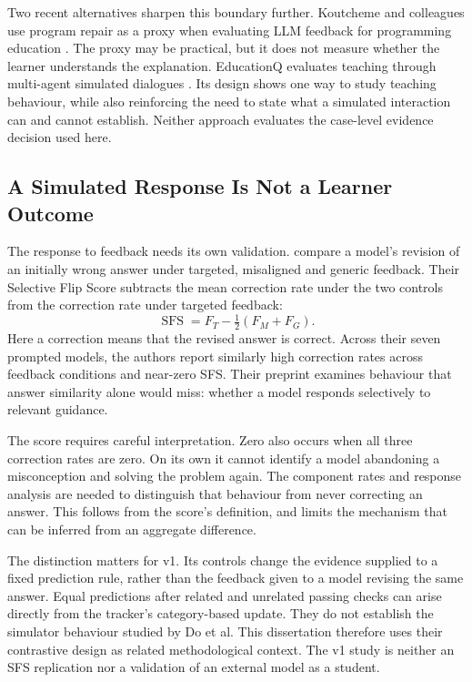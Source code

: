 Two recent alternatives sharpen this boundary further. Koutcheme and colleagues use program repair as a proxy when evaluating
LLM feedback for programming education \parencite{koutcheme2024repair}. The proxy may be practical, but it does not measure
whether the learner understands the explanation. EducationQ evaluates teaching through multi-agent simulated dialogues
\parencite{shi2025educationq}. Its design shows one way to study teaching behaviour, while also reinforcing the need to state
what a simulated interaction can and cannot establish. Neither approach evaluates the case-level evidence decision used here.

\subsection{A Simulated Response Is Not a Learner Outcome}

The response to feedback needs its own validation. \textcite[Sections 2.1--2.3]{do2026misconception} compare a model's revision of
an initially wrong answer under targeted, misaligned and generic feedback. Their Selective Flip Score subtracts the mean
correction rate under the two controls from the correction rate under targeted feedback:
\begin{equation}
 \operatorname{SFS}=F_T-\tfrac{1}{2}(F_M+F_G).
\end{equation}
Here a correction means that the revised answer is correct. Across their seven prompted models, the authors report similarly
high correction rates across feedback conditions and near-zero SFS. Their preprint examines behaviour that answer similarity
alone would miss: whether a model responds selectively to relevant guidance.

The score requires careful interpretation. Zero also occurs when all three correction rates are zero. On its own it cannot
identify a model abandoning a misconception and solving the problem again. The component rates and response analysis are
needed to distinguish that behaviour from never correcting an answer. This follows from the score's definition, and limits
the mechanism that can be inferred from an aggregate difference.

The distinction matters for v1. Its controls change the evidence supplied to a fixed prediction rule, rather than the feedback
given to a model revising the same answer. Equal predictions after related and unrelated passing checks can arise directly from
the tracker's category-based update. They do not establish the simulator behaviour studied by Do et al. This dissertation
therefore uses their contrastive design as related methodological context. The v1 study is neither an SFS replication nor a validation
of an external model as a student.

